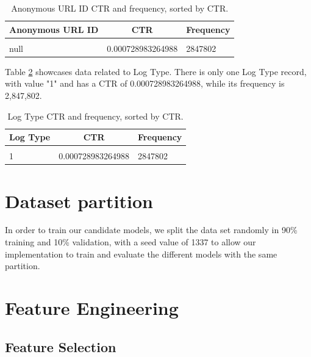 \documentclass{article} %
\begin{document}
\begin{table}[!htbp]
\caption{Anonymous URL ID CTR and frequency, sorted by CTR.}
\label{table:15}
\begin{center}
\begin{tabular}{l l l}
\multicolumn{1}{c}{\bf Anonymous URL ID} & \multicolumn{1}{c}{\bf CTR} & \multicolumn{1}{c}{\bf Frequency}
\\ \hline \\
null & 0.000728983264988 & 2847802\\
\end{tabular}
\end{center}
\end{table}

Table \ref{table:16} showcases data related to Log Type. There is only one Log Type record, with value "1" and has a CTR of 0.000728983264988, while its frequency is 2,847,802.

\begin{table}[!htbp]
\caption{Log Type CTR and frequency, sorted by CTR.}
\label{table:16}
\begin{center}
\begin{tabular}{l l l}
\multicolumn{1}{c}{\bf Log Type} & \multicolumn{1}{c}{\bf CTR} & \multicolumn{1}{c}{\bf Frequency}
\\ \hline \\
1 & 0.000728983264988 & 2847802\\
\end{tabular}
\end{center}
\end{table}

\section{Dataset partition}

In order to train our candidate models, we split the data set randomly in 90\% training and 10\% validation, with a seed value of 1337 to allow our implementation to train and evaluate the different models with the same partition.

\section{Feature Engineering}

\subsection{Feature Selection}
\end{document}
